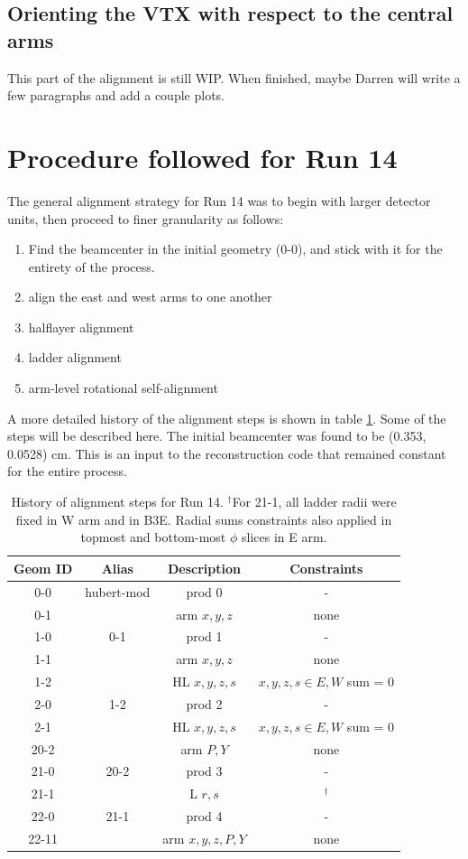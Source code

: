 \documentclass[12pt]{article}
\begin{document}
\subsection{Orienting the VTX with respect to the central arms}
This part of the alignment is still WIP. When finished, maybe Darren will write a few paragraphs and add a couple plots.

\section{Procedure followed for Run 14}
The general alignment strategy for Run 14 was to begin with larger detector units, then proceed to finer granularity as follows:
\begin{enumerate}
  \item Find the beamcenter in the initial geometry (0-0), and stick with it for the entirety of the process.
  \item align the east and west arms to one another
  \item halflayer alignment
  \item ladder alignment
  \item arm-level rotational self-alignment
\end{enumerate}
A more detailed history of the alignment steps is shown in table \ref{tab:history}. Some of the steps will be described here. The initial beamcenter was found to be (0.353, 0.0528) cm. This is an input to the reconstruction code that remained constant for the entire process. 

\begin{table}[htb!]
\centering
\begin{tabular}{c | c | c | c}
Geom ID & Alias & Description & Constraints \\
\hline
0-0 & hubert-mod & prod 0    & -\\
0-1 & & arm $x,y,z$          & none \\
1-0 & 0-1 & prod 1           & -\\
1-1 & & arm $x,y,z$          & none \\
1-2 & & HL $x,y,z,s$         & $x,y,z,s \in E,W$ sum = 0 \\
2-0 & 1-2 & prod 2           & -\\
2-1 & & HL $x,y,z,s$         & $x,y,z,s \in E,W$ sum = 0 \\
20-2 & & arm $P,Y$           & none \\
21-0 & 20-2 & prod 3         & -\\
21-1 & & L $r,s$             & $^\dagger$ \\
22-0 & 21-1 & prod 4         & -\\
22-11 & & arm $x,y,z,P,Y$    & none \\
\hline
\end{tabular}
\caption{History of alignment steps for Run 14. $^\dagger$For 21-1, all ladder radii were fixed in W arm and in B3E. Radial sums constraints also applied in topmost and bottom-most $\phi$ slices in E arm.}
\label{tab:history}
\end{table}
\end{document}
